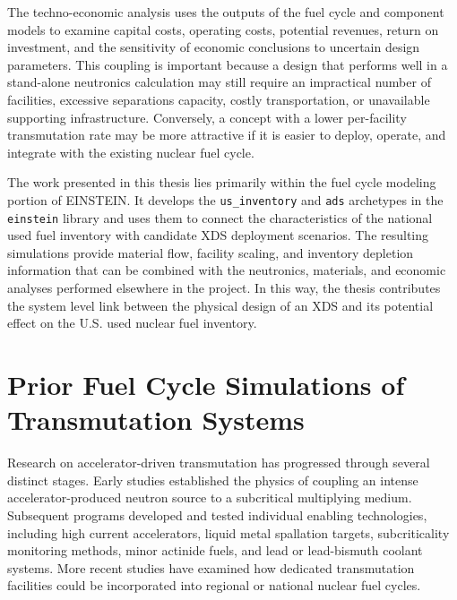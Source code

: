 The techno-economic analysis uses the outputs of the fuel cycle and
component models to examine capital costs, operating costs, potential
revenues, return on investment, and the sensitivity of economic conclusions
to uncertain design parameters. This coupling is important because a design
that performs well in a stand-alone neutronics calculation may still require
an impractical number of facilities, excessive separations capacity, costly
transportation, or unavailable supporting infrastructure. Conversely, a
concept with a lower per-facility transmutation rate may be more attractive
if it is easier to deploy, operate, and integrate with the existing nuclear
fuel cycle.

The work presented in this thesis lies primarily within the fuel cycle
modeling portion of \gls{EINSTEIN}. It develops the \texttt{us\_inventory} and
\texttt{ads} archetypes in the \texttt{einstein} library and uses them to
connect the characteristics of the national used fuel inventory with
candidate \gls{XDS} deployment scenarios. The resulting simulations provide
material flow, facility scaling, and inventory depletion information that can
be combined with the neutronics, materials, and economic analyses performed
elsewhere in the project. In this way, the thesis contributes the system level
link between the physical design of an \gls{XDS} and its potential effect on the
U.S. used nuclear fuel inventory.



\section{Prior Fuel Cycle Simulations of Transmutation Systems}
\label{sec:litrev}

Research on accelerator-driven transmutation has progressed through several
distinct stages. Early studies established the physics of coupling an intense
accelerator-produced neutron source to a subcritical multiplying medium.
Subsequent programs developed and tested individual enabling technologies,
including high current accelerators, liquid metal spallation targets,
subcriticality monitoring methods, minor actinide fuels, and lead or
lead-bismuth coolant systems. More recent studies have examined how dedicated
transmutation facilities could be incorporated into regional or national
nuclear fuel cycles.

